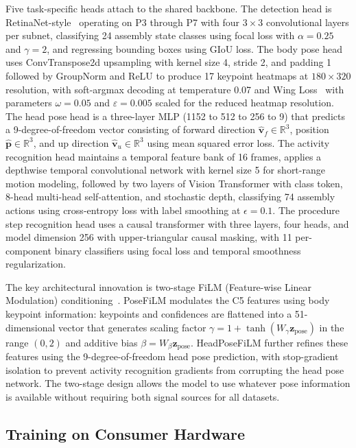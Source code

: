 \documentclass[10pt,twocolumn]{article}
\begin{document}
Five task-specific heads attach to the shared backbone. The detection head is RetinaNet-style~\cite{lin2017focal} operating on P3 through P7 with four \(3 \times 3\) convolutional layers per subnet, classifying 24 assembly state classes using focal loss with \(\alpha=0.25\) and \(\gamma=2\), and regressing bounding boxes using GIoU loss. The body pose head uses ConvTranspose2d upsampling with kernel size 4, stride 2, and padding 1 followed by GroupNorm and ReLU to produce 17 keypoint heatmaps at \(180 \times 320\) resolution, with soft-argmax decoding at temperature 0.07 and Wing Loss~\cite{feng2021wing} with parameters \(\omega=0.05\) and \(\varepsilon=0.005\) scaled for the reduced heatmap resolution. The head pose head is a three-layer MLP (1152 to 512 to 256 to 9) that predicts a 9-degree-of-freedom vector consisting of forward direction \(\hat{\mathbf{v}}_f \in \mathbb{R}^3\), position \(\hat{\mathbf{p}} \in \mathbb{R}^3\), and up direction \(\hat{\mathbf{v}}_u \in \mathbb{R}^3\) using mean squared error loss. The activity recognition head maintains a temporal feature bank of 16 frames, applies a depthwise temporal convolutional network with kernel size 5 for short-range motion modeling, followed by two layers of Vision Transformer with class token, 8-head multi-head self-attention, and stochastic depth, classifying 74 assembly actions using cross-entropy loss with label smoothing at \(\epsilon=0.1\). The procedure step recognition head uses a causal transformer with three layers, four heads, and model dimension 256 with upper-triangular causal masking, with 11 per-component binary classifiers using focal loss and temporal smoothness regularization.

The key architectural innovation is two-stage FiLM (Feature-wise Linear Modulation) conditioning~\cite{perez2018film}. PoseFiLM modulates the C5 features using body keypoint information: keypoints and confidences are flattened into a 51-dimensional vector that generates scaling factor \(\gamma = 1 + \tanh(W_\gamma \mathbf{z}_{\text{pose}})\) in the range \((0, 2)\) and additive bias \(\beta = W_\beta \mathbf{z}_{\text{pose}}\). HeadPoseFiLM further refines these features using the 9-degree-of-freedom head pose prediction, with stop-gradient isolation to prevent activity recognition gradients from corrupting the head pose network. The two-stage design allows the model to use whatever pose information is available without requiring both signal sources for all datasets.

\subsection{Training on Consumer Hardware}
\end{document}
